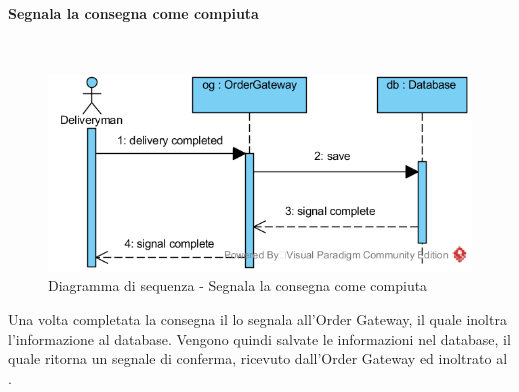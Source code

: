 \begin{samepage}
\paragraph{Segnala la consegna come compiuta}\mbox{}\\
\end{samepage}
\begin{figure}[H]
	\centering
	\includegraphics[width=15cm]{../../documenti/SpecificaTecnica/diagrammi/sequenza/fattorino_segnala_consegna_completata.png}
	\caption{Diagramma di sequenza - Segnala la consegna come compiuta}
\end{figure}
Una volta completata la consegna il \Deliveryman{} lo segnala all'Order Gateway, il quale inoltra l'informazione al database. Vengono quindi salvate le informazioni nel database, il quale ritorna un segnale di conferma, ricevuto dall'Order Gateway ed inoltrato al \Deliveryman{}.

